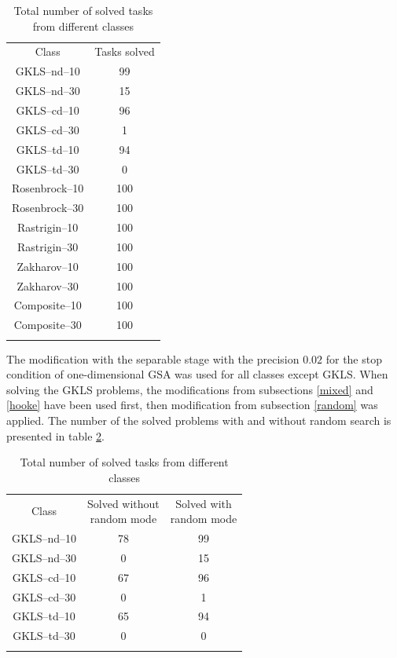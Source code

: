 \documentclass{llncs}
\begin{document}
\begin{table}
	\caption{Total number of solved tasks from different classes}
	\label{tab:solved}
	\center
	\begin{tabular}{cc}
		\hline\noalign{\smallskip}
	Class & Tasks solved   \\
	\noalign{\smallskip} \hline \noalign{\smallskip}		
		GKLS--nd--10 & 99 \\
		GKLS--nd--30 & 15 \\
		GKLS--cd--10 & 96 \\
		GKLS--cd--30 & 1 \\
		GKLS--td--10 & 94 \\
		GKLS--td--30 & 0 \\
		Rosenbrock--10 & 100 \\
		Rosenbrock--30 & 100 \\
		Rastrigin--10 & 100 \\
		Rastrigin--30 & 100 \\
		Zakharov--10 & 100 \\
		Zakharov--30 & 100 \\
		Composite--10 & 100 \\
		Composite--30 & 100 \\
		\noalign{\smallskip}\hline
	\end{tabular}
\end{table}

The modification with the separable stage with the precision $0.02$ for the stop condition of one-dimensional GSA was used for all classes except GKLS. When solving the GKLS problems, the modifications from subsections \ref{mixed} and \ref{hooke} have been used first, then modification from subsection \ref{random} was applied. %
The number of the solved problems with and without random search is presented in table \ref{tab:randsolved}.%

\begin{table}
	\caption{Total number of solved tasks from different classes}
	\label{tab:randsolved}
	\center
	\begin{tabular}{ccc}
		\hline\noalign{\smallskip}
	Class &  \parbox[c]{3cm}{ \centering  Solved without\\random mode}   & \parbox[c]{3cm}{ \centering Solved with\\random mode}    \\
	\noalign{\smallskip} \hline \noalign{\smallskip}		
		GKLS--nd--10 & 78 & 99 \\
		GKLS--nd--30 & 0 & 15 \\
		GKLS--cd--10 & 67 & 96 \\
		GKLS--cd--30 & 0 & 1 \\
		GKLS--td--10 & 65 & 94 \\
		GKLS--td--30 & 0 & 0 \\
		\noalign{\smallskip}\hline
	\end{tabular}
\end{table}
\end{document}
